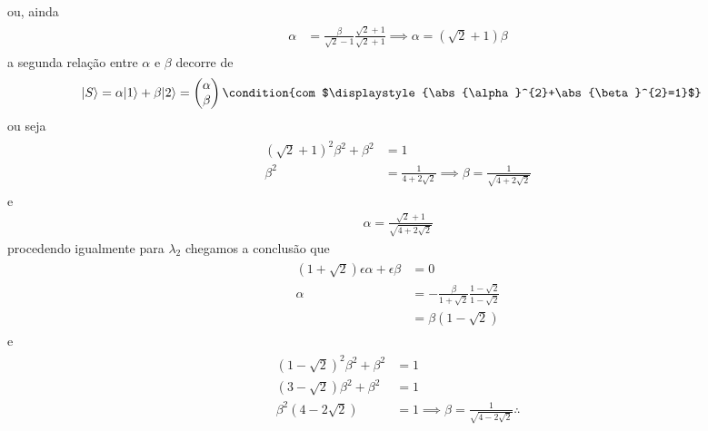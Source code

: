 \begin{prob}
\begin{sol}
\begin{enumerate}[label=\alph *)]
\begin{align}
						\end{align}
						ou, ainda
						\begin{align}
							\begin{split}
								\alpha &= \frac{\beta}{\sqrt{2}-1}\frac{\sqrt{2}+1}{\sqrt{2}+1}\implies \alpha=\left(\sqrt{2}+1\right) \beta
							\end{split}
						\end{align}
						a segunda relação entre $\alpha$ e $\beta$ decorre de
						\begin{align}
							|{S}\rangle &= \alpha |{1}\rangle + \beta |{2}\rangle =
							\begin{pmatrix}
								\alpha \\
								\beta
							\end{pmatrix}\condition{com $\displaystyle{\abs{\alpha}^{2}+\abs{\beta}^{2}=1}$}
						\end{align}
						ou seja
						\begin{align}
							\begin{split}
								\left(\sqrt{2}+1\right)^{2} \beta^{2}+\beta^{2} &= 1\\
								\beta^{2} &= \frac{1}{4+2\sqrt{2}}\implies \boxed{\beta=\frac{1}{\sqrt{4+2\sqrt{2}}}}
							\end{split}
						\end{align}
						e
						\begin{align}
							\boxed{
								\alpha = \frac{\sqrt{2}+1}{\sqrt{4+2\sqrt{2}}}
							}
						\end{align}
						procedendo igualmente para $\lambda_{2}$ chegamos a conclusão que
						\begin{align}
							\begin{split}
								\left(1+\sqrt{2}\right) \epsilon\alpha + \epsilon \beta &= 0\\
								\alpha &= -\frac{\beta}{1+\sqrt{2}}\frac{1-\sqrt{2}}{1-\sqrt{2}}\\
											 &= \beta \left(1-\sqrt{2}\right)
							\end{split}
						\end{align}
						e
						\begin{align}
							\begin{split}
								\left(1-\sqrt{2}\right)^{2} \beta^{2}+\beta^{2} &= 1\\
								\left(3-\sqrt{2}\right) \beta^{2}+\beta^{2} &= 1\\
								\beta^{2}\left(4-2\sqrt{2}\right) &= 1\implies \boxed{\beta=\frac{1}{\sqrt{4-2\sqrt{2}}}}\therefore

\end{split}
\end{align}
\end{enumerate}
\end{sol}
\end{prob}
